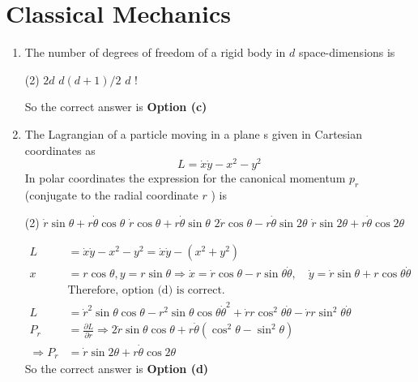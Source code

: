 \chapter{Classical Mechanics}
\begin{enumerate}
	\item The number of degrees of freedom of a rigid body in $d$ space-dimensions is
	{}
	 \begin{tasks}(2)
		\task[\textbf{a.}]$2 d$
		\task[\textbf{c.}]$d(d+1) / 2$
		\task[\textbf{d.}]  $d$ !
	\end{tasks}
	\begin{answer}
	So the correct answer is \textbf{Option (c)}
	\end{answer}
	\item The Lagrangian of a particle moving in a plane s given in Cartesian coordinates as
	$$
	L=\dot{x} \dot{y}-x^{2}-y^{2}
	$$
	In polar coordinates the expression for the canonical momentum $p_{r}$ (conjugate to the radial coordinate $r$ ) is
{}
	 \begin{tasks}(2)
		\task[\textbf{a.}]$\dot{r} \sin \theta+r \dot{\theta} \cos \theta$
		\task[\textbf{b.}]$\dot{r} \cos \theta+r \dot{\theta} \sin \theta$
		\task[\textbf{c.}]$2 \dot{r} \cos \theta-r \dot{\theta} \sin 2 \theta$
		\task[\textbf{d.}] $\dot{r} \sin 2 \theta+r \dot{\theta} \cos 2 \theta$
	\end{tasks}
\begin{answer}
	$$
	\begin{aligned}
	L&=\dot{x} \dot{y}-x^{2}-y^{2}=\dot{x} \dot{y}-\left(x^{2}+y^{2}\right)\\
	x&=r \cos \theta, y=r \sin \theta \Rightarrow \dot{x}=\dot{r} \cos \theta-r \sin \theta \dot{\theta}, \quad \dot{y}=\dot{r} \sin \theta+r \cos \theta \dot{\theta}\\
	&\text{Therefore, option
	(d) is correct.}\\
L&=\dot{r}^{2} \sin \theta \cos \theta-r^{2} \sin \theta \cos \theta \dot{\theta}^{2}+\dot{r} r \cos ^{2} \theta \dot{\theta}-\dot{r} r \sin ^{2} \theta \dot{\theta}\\
P_{r}&=\frac{\partial L}{\partial \dot{r}} \Rightarrow 2 \dot{r} \sin \theta \cos \theta+r \dot{\theta}\left(\cos ^{2} \theta-\sin ^{2} \theta\right)\\
\Rightarrow P_{r}&=\dot{r} \sin 2 \theta+r \dot{\theta} \cos 2 \theta
\end{aligned}
$$
	So the correct answer is \textbf{Option (d)}
\end{answer}

\end{enumerate}
